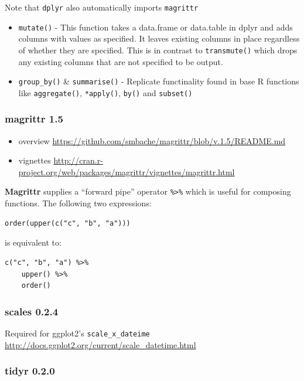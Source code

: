 \documentclass[]{article}
\begin{document}
Note that \texttt{dplyr} also automatically imports \texttt{magrittr}

\begin{itemize}
\item
  \texttt{mutate()} - This function takes a data.frame or data.table in
  dplyr and adds columns with values as specified. It leaves existing
  columns in place regardless of whether they are specified. This is in
  contrast to \texttt{transmute()} which drops any existing columns that
  are not specified to be output.
\item
  \texttt{group\_by()} \& \texttt{summarise()} - Replicate functinality
  found in base R functions like \texttt{aggregate()},
  \texttt{*apply()}, \texttt{by()} and \texttt{subset()}
\end{itemize}

\subsubsection{magrittr 1.5}\label{magrittr-1.5}

\begin{itemize}
\itemsep1pt\parskip0pt
\item
  overview
  \url{https://github.com/smbache/magrittr/blob/v.1.5/README.md}
\item
  vignettes
  \url{http://cran.r-project.org/web/packages/magrittr/vignettes/magrittr.html}
\end{itemize}

\textbf{Magrittr} supplies a ``forward pipe'' operator
\texttt{\%\textgreater{}\%} which is useful for composing functions. The
following two expressions:

\begin{verbatim}
order(upper(c("c", "b", "a")))
\end{verbatim}

is equivalent to:

\begin{verbatim}
c("c", "b", "a") %>%
    upper() %>%
    order()
\end{verbatim}

\subsubsection{scales 0.2.4}\label{scales-0.2.4}

Required for ggplot2's \texttt{scale\_x\_dateime}
\url{http://docs.ggplot2.org/current/scale_datetime.html}

\subsubsection{tidyr 0.2.0}\label{tidyr-0.2.0}
\end{document}
